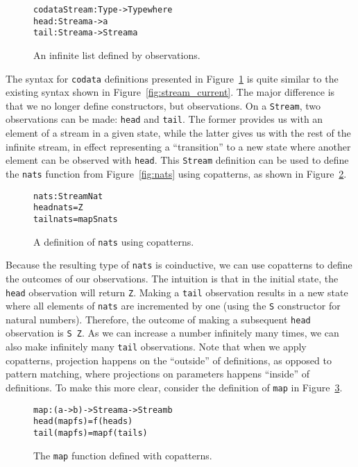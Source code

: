 \begin{figure}
\begin{alltt}
codata Stream : Type -> Type where
  head : Stream a -> a
  tail : Stream a -> Stream a 
\end{alltt}
\caption{An infinite list defined by observations.}
\label{fig:stream}
\end{figure}

The syntax for \texttt{codata} definitions presented in Figure~\ref{fig:stream} is quite similar to the existing syntax shown in Figure~\ref{fig:stream_current}. The major difference is that we no longer define constructors, but observations. On a \texttt{Stream}, two observations can be made: \texttt{head} and \texttt{tail}. The former provides us with an element of a stream in a given state, while the latter gives us with the rest of the infinite stream, in effect representing a ``transition'' to a new state where another element can be observed with \texttt{head}. This \texttt{Stream} definition can be used to define the \texttt{nats} function from Figure~\ref{fig:nats} using copatterns, as shown in Figure~\ref{fig:nats_copatterns}.

\begin{figure}
\begin{alltt}
nats : Stream Nat
head nats = Z
tail nats = map S nats
\end{alltt}
\caption{A definition of \texttt{nats} using copatterns.}
\label{fig:nats_copatterns}
\end{figure}

Because the resulting type of \texttt{nats} is coinductive, we can use copatterns to define the outcomes of our observations. The intuition is that in the initial state, the \texttt{head} observation will return \texttt{Z}. Making a \texttt{tail} observation results in a new state where all elements of \texttt{nats} are incremented by one (using the \texttt{S} constructor for natural numbers). Therefore, the outcome of making a subsequent \texttt{head} observation is \texttt{S Z}. As we can increase a number infinitely many times, we can also make infinitely many \texttt{tail} observations. Note that when we apply copatterns, projection happens on the ``outside'' of definitions, as opposed to pattern matching, where projections on parameters happens ``inside'' of definitions. To make this more clear, consider the definition of \texttt{map} in Figure~\ref{fig:map_copatterns}.

\begin{figure}
\begin{alltt}
map : (a -> b) -> Stream a -> Stream b
head (map f s) = f (head s)
tail (map f s) = map f (tail s)
\end{alltt}
\caption{The \texttt{map} function defined with copatterns.}
\label{fig:map_copatterns}
\end{figure}

